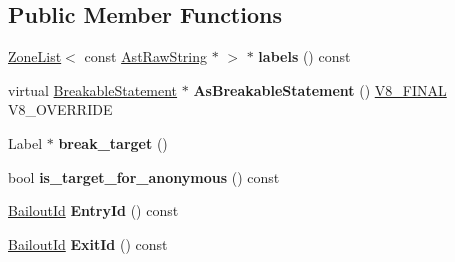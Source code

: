 \subsection*{Public Member Functions}
\begin{DoxyCompactItemize}
\item 
\hypertarget{classv8_1_1internal_1_1_breakable_statement_a617d1f438ecd5e785ee73626504a8ace}{}\hyperlink{classv8_1_1internal_1_1_zone_list}{Zone\+List}$<$ const \hyperlink{classv8_1_1internal_1_1_ast_raw_string}{Ast\+Raw\+String} $\ast$ $>$ $\ast$ {\bfseries labels} () const \label{classv8_1_1internal_1_1_breakable_statement_a617d1f438ecd5e785ee73626504a8ace}

\item 
\hypertarget{classv8_1_1internal_1_1_breakable_statement_a9cfbf8bcb8b8bfd9b2841da0981a9afe}{}virtual \hyperlink{classv8_1_1internal_1_1_breakable_statement}{Breakable\+Statement} $\ast$ {\bfseries As\+Breakable\+Statement} () \hyperlink{classv8_1_1internal_1_1_v8___f_i_n_a_l}{V8\+\_\+\+F\+I\+N\+A\+L} V8\+\_\+\+O\+V\+E\+R\+R\+I\+D\+E\label{classv8_1_1internal_1_1_breakable_statement_a9cfbf8bcb8b8bfd9b2841da0981a9afe}

\item 
\hypertarget{classv8_1_1internal_1_1_breakable_statement_af68546685f7b853b37c7972f3f4553f5}{}Label $\ast$ {\bfseries break\+\_\+target} ()\label{classv8_1_1internal_1_1_breakable_statement_af68546685f7b853b37c7972f3f4553f5}

\item 
\hypertarget{classv8_1_1internal_1_1_breakable_statement_a5a5968a2aab89f8490235ae8ce9fe412}{}bool {\bfseries is\+\_\+target\+\_\+for\+\_\+anonymous} () const \label{classv8_1_1internal_1_1_breakable_statement_a5a5968a2aab89f8490235ae8ce9fe412}

\item 
\hypertarget{classv8_1_1internal_1_1_breakable_statement_a27d7524229a6795fff6ea260768e36f4}{}\hyperlink{classv8_1_1internal_1_1_bailout_id}{Bailout\+Id} {\bfseries Entry\+Id} () const \label{classv8_1_1internal_1_1_breakable_statement_a27d7524229a6795fff6ea260768e36f4}

\item 
\hypertarget{classv8_1_1internal_1_1_breakable_statement_a1cc6c711474d567958b3dd994a2dc745}{}\hyperlink{classv8_1_1internal_1_1_bailout_id}{Bailout\+Id} {\bfseries Exit\+Id} () const \label{classv8_1_1internal_1_1_breakable_statement_a1cc6c711474d567958b3dd994a2dc745}

\end{DoxyCompactItemize}
